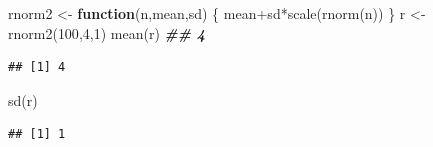 \documentclass[
]{book}
\newenvironment{Shaded}{\begin{snugshade}}{\end{snugshade}}
\newcommand{\ControlFlowTok}[1]{\textcolor[rgb]{0.13,0.29,0.53}{\textbf{#1}}}
\newcommand{\DecValTok}[1]{\textcolor[rgb]{0.00,0.00,0.81}{#1}}
\newcommand{\DocumentationTok}[1]{\textcolor[rgb]{0.56,0.35,0.01}{\textbf{\textit{#1}}}}
\newcommand{\FunctionTok}[1]{\textcolor[rgb]{0.00,0.00,0.00}{#1}}
\newcommand{\NormalTok}[1]{#1}
\newcommand{\OtherTok}[1]{\textcolor[rgb]{0.56,0.35,0.01}{#1}}
\newcommand{\SpecialCharTok}[1]{\textcolor[rgb]{0.00,0.00,0.00}{#1}}
\begin{document}
\begin{Shaded}
\begin{Highlighting}[]
\NormalTok{rnorm2 }\OtherTok{\textless{}{-}} \ControlFlowTok{function}\NormalTok{(n,mean,sd) \{ mean}\SpecialCharTok{+}\NormalTok{sd}\SpecialCharTok{*}\FunctionTok{scale}\NormalTok{(}\FunctionTok{rnorm}\NormalTok{(n)) \}}
\NormalTok{r }\OtherTok{\textless{}{-}} \FunctionTok{rnorm2}\NormalTok{(}\DecValTok{100}\NormalTok{,}\DecValTok{4}\NormalTok{,}\DecValTok{1}\NormalTok{)}
\FunctionTok{mean}\NormalTok{(r)  }\DocumentationTok{\#\# 4}
\end{Highlighting}
\end{Shaded}

\begin{verbatim}
## [1] 4
\end{verbatim}

\begin{Shaded}
\begin{Highlighting}[]
\FunctionTok{sd}\NormalTok{(r)}
\end{Highlighting}
\end{Shaded}

\begin{verbatim}
## [1] 1
\end{verbatim}
\end{document}
